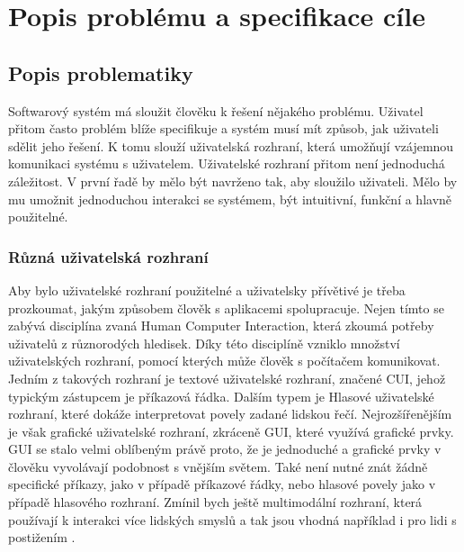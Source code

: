 \chapter{Popis problému a specifikace cíle}
\section{Popis problematiky}

Softwarový systém má sloužit člověku k řešení nějakého problému. Uživatel přitom často problém blíže specifikuje a systém musí mít způsob, jak uživateli sdělit jeho řešení. K tomu slouží uživatelská rozhraní, která umožňují vzájemnou komunikaci systému s uživatelem. Uživatelské rozhraní přitom není jednoduchá záležitost. V první řadě by mělo být navrženo tak, aby sloužilo uživateli. Mělo by mu umožnit jednoduchou interakci se systémem, být intuitivní, funkční a hlavně použitelné. 


\subsection{Různá uživatelská rozhraní}
Aby bylo uživatelské rozhraní použitelné a uživatelsky přívětivé je třeba prozkoumat, jakým způsobem člověk s aplikacemi spolupracuje. Nejen tímto se zabývá disciplína zvaná Human Computer Interaction, která zkoumá potřeby uživatelů z různorodých hledisek. Díky této disciplíně vzniklo množství uživatelských rozhraní, pomocí kterých může člověk s počítačem komunikovat. Jedním z takových rozhraní je textové uživatelské rozhraní, značené CUI, jehož typickým zástupcem je příkazová řádka. Dalším typem je Hlasové uživatelské rozhraní, které dokáže interpretovat povely zadané lidskou řečí. Nejrozšířenějším je však grafické uživatelské rozhraní, zkráceně GUI, které využívá grafické prvky. GUI se stalo velmi oblíbeným právě proto, že je jednoduché a grafické prvky v člověku vyvolávají podobnost s vnějším světem. Také není nutné znát žádně specifické příkazy, jako v případě příkazové řádky, nebo hlasové povely jako v případě hlasového rozhraní. Zmínil bych ještě multimodální rozhraní, která používají k interakci více lidských smyslů a tak jsou vhodná například i pro lidi s postižením \cite{uiTypes}. 

